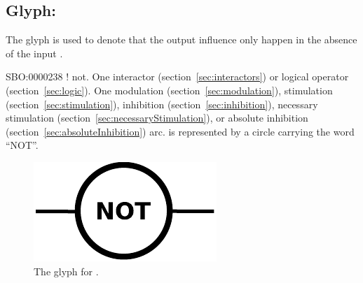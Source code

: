 \color{blue}
\subsection{Glyph: }\label{sec:not}

The glyph  is used to denote that the output influence only happen in the absence of the input .

\begin{glyphDescription}
 \glyphSboTerm SBO:0000238 ! not.
 \glyphOrigin One interactor (section~\ref{sec:interactors}) or logical operator (section~\ref{sec:logic}).
 \glyphTarget  One modulation (section~\ref{sec:modulation}), stimulation (section~\ref{sec:stimulation}), inhibition (section~\ref{sec:inhibition}), necessary  stimulation (section~\ref{sec:necessaryStimulation}), or absolute inhibition (section~\ref{sec:absoluteInhibition}) arc.
 \glyphNode {} is represented by a circle carrying the word ``NOT''.
 \end{glyphDescription}

\begin{figure}[H]
  \centering
  \includegraphics[scale = 0.5]{images/not}
  \caption{The \ER glyph for .}
  \label{fig:not}
\end{figure}

